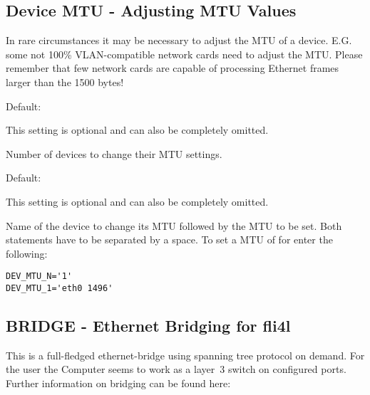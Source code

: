 {
\subsection {Device MTU - Adjusting MTU Values}
}

In rare circumstances it may be necessary to adjust the MTU of a device.
E.G. some not 100\% VLAN-compatible network cards need to adjust the MTU. 
Please remember that few network cards are capable of processing Ethernet 
frames larger than the 1500 bytes!

\begin{description}


  Default: 

  This setting is optional and can also be completely omitted.

  Number of devices to change their MTU settings.


  Default: 

  This setting is optional and can also be completely omitted.

  Name of the device to change its MTU followed by the MTU to be set.
  Both statements have to be separated by a space.
  To set a MTU of  for  
  enter the following:

\begin{example}
\begin{verbatim}
DEV_MTU_N='1'
DEV_MTU_1='eth0 1496'
\end{verbatim}
\end{example}

\end{description}

{
\subsection {BRIDGE - Ethernet Bridging for fli4l}
}

This is a full-fledged ethernet-bridge using spanning tree protocol
on demand. For the user the Computer seems to work as a layer~3 
switch on configured ports.
\hfil\break
Further information on bridging can be found here:

